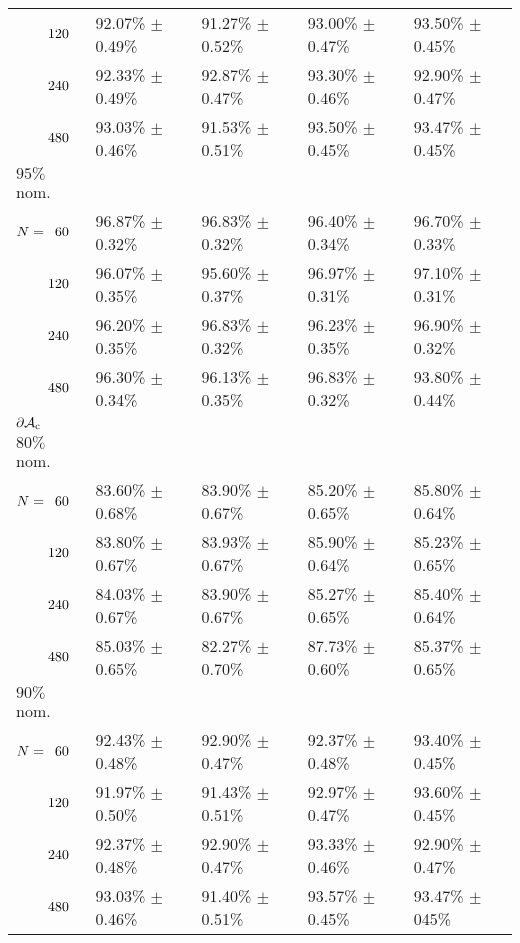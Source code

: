 \begin{onehalfspace}
\begin{table}[htbp]
\begin{tabular}{@{}p{}*{4}{L{\tabcolsep\relax}}@{}}
$\hphantom{N{}={}}120$ & 92.07\% $\pm$ 0.49\% & 91.27\% $\pm$ 0.52\% & 93.00\% $\pm$ 0.47\% & 93.50\% $\pm$ 0.45\% \\[-0.4em]
$\hphantom{N{}={}}240$ & 92.33\% $\pm$ 0.49\% & 92.87\% $\pm$ 0.47\% & 93.30\% $\pm$ 0.46\% & 92.90\% $\pm$ 0.47\% \\[-0.4em]
$\hphantom{N{}={}}480$ & 93.03\% $\pm$ 0.46\% & 91.53\% $\pm$ 0.51\% & 93.50\% $\pm$ 0.45\% & 93.47\% $\pm$ 0.45\%\\ 
$95\%$ nom.  \\[-0.4em]
$N = \hphantom{1}60$ & 96.87\% $\pm$ 0.32\% & 96.83\% $\pm$ 0.32\% & 96.40\% $\pm$ 0.34\% & 96.70\% $\pm$ 0.33\% \\[-0.4em]
$\hphantom{N{}={}}120$ & 96.07\% $\pm$ 0.35\% & 95.60\% $\pm$ 0.37\% & 96.97\% $\pm$ 0.31\% & 97.10\% $\pm$ 0.31\% \\[-0.4em]
$\hphantom{N{}={}}240$ & 96.20\% $\pm$ 0.35\% & 96.83\% $\pm$ 0.32\% & 96.23\% $\pm$ 0.35\% & 96.90\% $\pm$ 0.32\% \\[-0.4em]
$\hphantom{N{}={}}480$ & 96.30\% $\pm$ 0.34\% & 96.13\% $\pm$ 0.35\% & 96.83\% $\pm$ 0.32\% & 93.80\% $\pm$ 0.44\%\\
\midrule
$\mathbf{\operatorname{\partial\mathcal{A}_{c}}}$\\[-0.4em]
$80\%$ nom.\\[-0.4em]
$N = \hphantom{1}60$ & 83.60\% $\pm$ 0.68\% & 83.90\% $\pm$ 0.67\% & 85.20\% $\pm$ 0.65\% & 85.80\% $\pm$ 0.64\% \\[-0.4em]
$\hphantom{N{}={}}120$ & 83.80\% $\pm$ 0.67\% & 83.93\% $\pm$ 0.67\% & 85.90\% $\pm$ 0.64\% & 85.23\% $\pm$ 0.65\%\\[-0.4em]
$\hphantom{N{}={}}240$ & 84.03\% $\pm$ 0.67\% & 83.90\% $\pm$ 0.67\% & 85.27\% $\pm$ 0.65\% & 85.40\% $\pm$ 0.64\% \\[-0.4em]
$\hphantom{N{}={}}480$ & 85.03\% $\pm$ 0.65\% & 82.27\% $\pm$ 0.70\% & 87.73\% $\pm$ 0.60\% & 85.37\% $\pm$ 0.65\%\\ 
$90\%$ nom.  \\[-0.4em]
$N = \hphantom{1}60$ & 92.43\% $\pm$ 0.48\% & 92.90\% $\pm$ 0.47\% & 92.37\% $\pm$ 0.48\% & 93.40\% $\pm$ 0.45\% \\[-0.4em]
$\hphantom{N{}={}}120$ & 91.97\% $\pm$ 0.50\% & 91.43\% $\pm$ 0.51\% & 92.97\% $\pm$ 0.47\% & 93.60\% $\pm$ 0.45\% \\[-0.4em]
$\hphantom{N{}={}}240$ & 92.37\% $\pm$ 0.48\% & 92.90\% $\pm$ 0.47\% & 93.33\% $\pm$ 0.46\% & 92.90\% $\pm$ 0.47\% \\[-0.4em]
$\hphantom{N{}={}}480$ & 93.03\% $\pm$ 0.46\% & 91.40\% $\pm$ 0.51\% & 93.57\% $\pm$ 0.45\% & 93.47\% $\pm$ 045\%\\ 

\end{tabular}
\end{table}
\end{onehalfspace}
